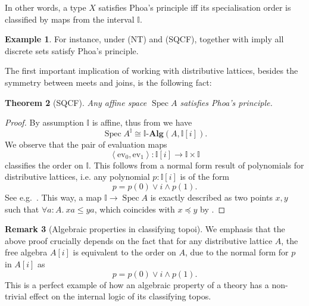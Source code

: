 \documentclass[12pt]{amsart}
\newtheorem{theorem}{Theorem}[section]
\theoremstyle{definition}
\newtheorem{example}[theorem]{Example}
\newtheorem{remark}[theorem]{Remark}
\newcommand{\mb}[1]{\mathbf{#1}}
\newcommand{\mbb}[1]{\mathbb{#1}}
\newcommand{\I}{\mbb I}
\newcommand{\alg}{\text{-}\mb{Alg}}
\newcommand{\pair}[1]{\left\langle#1\right\rangle}
\newcommand{\ev}{\mathrm{ev}}
\newcommand{\fa}[2]{\forall #1\!\colon\!\!#2.\ }
\newcommand{\spec}{\operatorname{Spec}}
\begin{document}

In other words, a type $X$ satisfies Phoa's principle iff its specialisation order is classified by maps from the interval $\I$.

\begin{example}
  For instance, under (NT) and (SQCF),  together with  imply all discrete sets satisfy Phoa's principle.
\end{example}

The first important implication of working with distributive lattices, besides the symmetry between meets and joins, is the following fact:

\begin{theorem}[SQCF]\label{thm:phoaaffine}
  Any affine space $\spec A$ satisfies Phoa's principle.
\end{theorem}
\begin{proof}
  By assumption $\I$ is affine, thus from  we have
  \[ \spec A^\I \cong \I\alg(A,\I[i]). \]
  We observe that the pair of evaluation maps
  \[ \pair{\ev_0,\ev_1} : \I[i] \to \I \times \I \]
  classifies the order on $\I$. This follows from a normal form result of polynomials for distributive lattices, i.e. any polynomial $p:\I[i]$ is of the form 
  \[ p = p(0) \vee i \wedge p(1). \]
  See e.g.~\cite[Thm. 10.11]{lausch2000algebra}. This way, a map $\I \to \spec A$ is exactly described as two points $x,y$ such that $\fa aA xa \le ya$, which coincides with $x \preceq y$ by .
\end{proof}

\begin{remark}[Algebraic properties in classifying topoi]\label{rem:normalalgebra}
  We emphasis that the above proof crucially depends on the fact that for any distributive lattice $A$, the free algebra $A[i]$ is equivalent to the order on $A$, due to the normal form for $p$ in $A[i]$ as 
  \[ p = p(0) \vee i \wedge p(1). \]
  This is a perfect example of how an algebraic property of a theory has a non-trivial effect on the internal logic of its classifying topos.
\end{remark}
\end{document}

